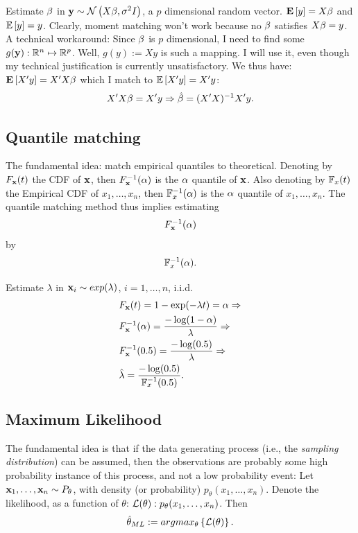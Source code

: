\begin{example}

Estimate $\beta$ in $\mathbf{y} \sim \mathcal{N}\left(X\beta,\sigma^2 I\right)$, a $p$ dimensional random vector.
$\mathbf{E}\left[ y \right]=X\beta$ and $\mathbb{E}\left[y\right]=y$.
Clearly, moment matching won't work because no $\beta$ satisfies $X\beta=y$.
A technical workaround:
Since $\beta$ is $p$ dimensional, I need to find some $g(\mathbf{y}): \mathbb{R}^n \mapsto \mathbb{R}^p$.
Well, $g(y):=Xy$ is such a mapping. I will use it, even though my technical justification is currently unsatisfactory. We thus have:
$\mathbf{E}\left[ X'y \right]=X'X\beta$ which I match to $\mathbb{E}\left[X'y\right]=X'y$:
$$
  X'X \beta = X' y \Rightarrow \hat{\beta}=(X'X)^{-1} X'y.
$$

\end{example}


\subsection{Quantile matching}
\label{sec:quantiles}

The fundamental idea: match empirical quantiles to theoretical. 
Denoting by $F_{\mathbf{x}} (t)$ the CDF of $\mathbf{x}$, then $F_{\mathbf{x}}^{-1} (\alpha)$ is the $\alpha$ quantile of $\mathbf{x}$.
Also denoting by $\mathbb{F}_{x}(t)$ the Empirical CDF of $x_1,\dots, x_n$, then $\mathbb{F}^{-1}_{x}(\alpha)$ is the $\alpha$ quantile of $x_1,\dots, x_n$.
The quantile matching method thus implies estimating
$$ F_{\mathbf{x}}^{-1} (\alpha) $$
by 
$$ \mathbb{F}^{-1}_{x}(\alpha)  . $$

\begin{example}
Estimate $\lambda$ in $\mathbf{x}_i \sim exp(\lambda)$, $i=1,\dots,n$, i.i.d.
\begin{align*}
	& F_{\mathbf{x}} (t) = 1-\exp(-\lambda t) = \alpha \Rightarrow \\
	& F_{\mathbf{x}}^{-1} (\alpha) = \frac{-\log(1-\alpha)}{\lambda} \Rightarrow \\
	& F_{\mathbf{x}}^{-1} (0.5) = \frac{-\log(0.5)}{\lambda} \Rightarrow \\
	& \hat{\lambda} = \frac{-\log(0.5)}{\mathbb{F}^{-1}_{x}(0.5)}.
\end{align*}

\end{example}


\subsection{Maximum Likelihood}
\label{sec:ml}

The fundamental idea is that if the data generating process (i.e., the \emph{sampling distribution}) can be assumed, then the observations are probably some high probability instance of this process, and not a low probability event:
Let $\mathbf{x}_1,\dots,\mathbf{x}_n \sim P_\theta$, with density (or probability) $p_\theta(x_1,\dots,x_n)$.
Denote the likelihood, as a function of $\theta$: $\mathcal{L}(\theta): p_\theta(x_1,\dots,x_n)$.
Then $$\hat{\theta}_{ML}:= argmax_{\theta}\left\{  \mathcal{L}(\theta)  \right\}.$$

